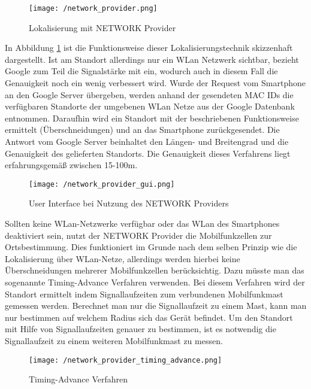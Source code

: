 \begin{figure}[H]
	\centering
	\texttt{[image: /network\_provider.png]}
	\caption[Lokalisierung: Lokalisierung mit NETWORK Provider]{Lokalisierung mit NETWORK Provider}
	\label{fig:networkProviderfunc}
\end{figure}

In Abbildung \ref{fig:networkProviderfunc} ist die Funktionsweise dieser Lokalisierungstechnik skizzenhaft dargestellt. Ist am Standort allerdings nur ein WLan Netzwerk sichtbar, bezieht Google zum Teil die Signalstärke mit ein, wodurch auch in diesem Fall die Genauigkeit noch ein wenig verbessert wird.
Wurde der Request vom Smartphone an den Google Server übergeben, werden anhand der gesendeten MAC IDs die verfügbaren Standorte der umgebenen WLan Netze aus der Google Datenbank entnommen. Daraufhin wird ein Standort mit der beschriebenen Funktionsweise ermittelt (Überschneidungen) und an das Smartphone zurückgesendet. Die Antwort vom Google Server beinhaltet den Längen- und Breitengrad und die Genauigkeit des gelieferten Standorts. 
Die Genauigkeit dieses Verfahrens liegt erfahrungsgemäß zwischen 15-100m.

\begin{figure}[H]
\centering
\texttt{[image: /network\_provider\_gui.png]}
\caption[Lokalisierung: User Interface bei Nutzung des NETWORK Providers]{User Interface bei Nutzung des NETWORK Providers}
\label{fig:networkProviderGui}
\end{figure}

Sollten keine WLan-Netzwerke verfügbar oder das WLan des Smartphones deaktiviert sein, nutzt der NETWORK Provider die Mobilfunkzellen zur Ortsbestimmung. Dies funktioniert im Grunde nach dem selben Prinzip wie die Lokalisierung über WLan-Netze, allerdings werden hierbei keine Überschneidungen mehrerer Mobilfunkzellen berücksichtig. Dazu müsste man das sogenannte Timing-Advance Verfahren verwenden. Bei diesem Verfahren wird der Standort ermittelt indem Signallaufzeiten zum verbundenen Mobilfunkmast gemessen werden. Berechnet man nur die Signallaufzeit zu einem Mast, kann man nur bestimmen auf welchem Radius sich das Gerät befindet. Um den Standort mit Hilfe von Signallaufzeiten genauer zu bestimmen, ist es notwendig die Signallaufzeit zu einem weiteren Mobilfunkmast zu messen.

\begin{figure}[H]
\centering
\texttt{[image: /network\_provider\_timing\_advance.png]}
\caption[Lokalisierung: Timing-Advance Verfahren]{Timing-Advance Verfahren}
\label{fig:networkProviderTimingAdvance}
\end{figure}


